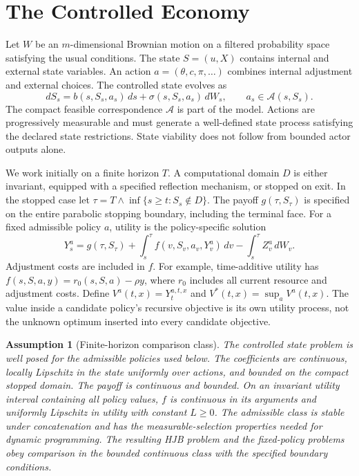 \documentclass[ecta,nameyear,draft]{econsocart}
\newtheorem{assumption}{Assumption}
\theoremstyle{definition}
\theoremstyle{remark}
\newcommand{\Act}{\mathcal A}
\begin{document}
\section{The Controlled Economy}\label{sec:model}
Let $W$ be an $m$-dimensional Brownian motion on a filtered probability space satisfying the usual conditions. The state $S=(u,X)$ contains internal and external state variables. An action $a=(\theta,c,\pi,\ldots)$ combines internal adjustment and external choices. The controlled state evolves as
\begin{equation}\label{eq:state}
 dS_s=b(s,S_s,a_s)\,ds+\sigma(s,S_s,a_s)\,dW_s,
 \qquad a_s\in\Act(s,S_s).
\end{equation}
The compact feasible correspondence $\Act$ is part of the model. Actions are progressively measurable and must generate a well-defined state process satisfying the declared state restrictions. State viability does not follow from bounded actor outputs alone.

We work initially on a finite horizon $T$. A computational domain $D$ is either invariant, equipped with a specified reflection mechanism, or stopped on exit. In the stopped case let $\tau=T\wedge\inf\{s\geq t:S_s\notin D\}$. The payoff $g(\tau,S_\tau)$ is specified on the entire parabolic stopping boundary, including the terminal face. For a fixed admissible policy $a$, utility is the policy-specific solution
\begin{equation}\label{eq:bsde}
 Y_s^a=g(\tau,S_\tau)+\int_s^\tau f(v,S_v,a_v,Y_v^a)\,dv
                    -\int_s^\tau Z_v^a\,dW_v.
\end{equation}
Adjustment costs are included in $f$. For example, time-additive utility has $f(s,S,a,y)=r_0(s,S,a)-\rho y$, where $r_0$ includes all current resource and adjustment costs. Define $V^a(t,x)=Y_t^{a,t,x}$ and $V^*(t,x)=\sup_a V^a(t,x)$. The value inside a candidate policy's recursive objective is its own utility process, not the unknown optimum inserted into every candidate objective.

\begin{assumption}[Finite-horizon comparison class]\label{ass:model}
The controlled state problem is well posed for the admissible policies used below. The coefficients are continuous, locally Lipschitz in the state uniformly over actions, and bounded on the compact stopped domain. The payoff is continuous and bounded. On an invariant utility interval containing all policy values, $f$ is continuous in its arguments and uniformly Lipschitz in utility with constant $L\geq0$. The admissible class is stable under concatenation and has the measurable-selection properties needed for dynamic programming. The resulting HJB problem and the fixed-policy problems obey comparison in the bounded continuous class with the specified boundary conditions.
\end{assumption}
\end{document}
